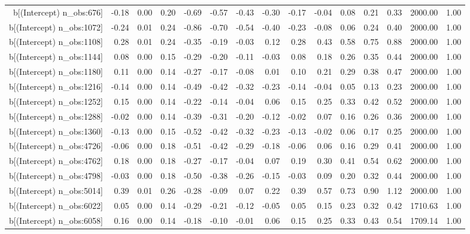 \begin{table}[ht]
\begin{tabular}{rrrrrrrrrrrrrrr}
  b[(Intercept) n\_obs:676] & -0.18 & 0.00 & 0.20 & -0.69 & -0.57 & -0.43 & -0.30 & -0.17 & -0.04 & 0.08 & 0.21 & 0.33 & 2000.00 & 1.00 \\ 
  b[(Intercept) n\_obs:1072] & -0.24 & 0.01 & 0.24 & -0.86 & -0.70 & -0.54 & -0.40 & -0.23 & -0.08 & 0.06 & 0.24 & 0.40 & 2000.00 & 1.00 \\ 
  b[(Intercept) n\_obs:1108] & 0.28 & 0.01 & 0.24 & -0.35 & -0.19 & -0.03 & 0.12 & 0.28 & 0.43 & 0.58 & 0.75 & 0.88 & 2000.00 & 1.00 \\ 
  b[(Intercept) n\_obs:1144] & 0.08 & 0.00 & 0.15 & -0.29 & -0.20 & -0.11 & -0.03 & 0.08 & 0.18 & 0.26 & 0.35 & 0.44 & 2000.00 & 1.00 \\ 
  b[(Intercept) n\_obs:1180] & 0.11 & 0.00 & 0.14 & -0.27 & -0.17 & -0.08 & 0.01 & 0.10 & 0.21 & 0.29 & 0.38 & 0.47 & 2000.00 & 1.00 \\ 
  b[(Intercept) n\_obs:1216] & -0.14 & 0.00 & 0.14 & -0.49 & -0.42 & -0.32 & -0.23 & -0.14 & -0.04 & 0.05 & 0.13 & 0.23 & 2000.00 & 1.00 \\ 
  b[(Intercept) n\_obs:1252] & 0.15 & 0.00 & 0.14 & -0.22 & -0.14 & -0.04 & 0.06 & 0.15 & 0.25 & 0.33 & 0.42 & 0.52 & 2000.00 & 1.00 \\ 
  b[(Intercept) n\_obs:1288] & -0.02 & 0.00 & 0.14 & -0.39 & -0.31 & -0.20 & -0.12 & -0.02 & 0.07 & 0.16 & 0.26 & 0.36 & 2000.00 & 1.00 \\ 
  b[(Intercept) n\_obs:1360] & -0.13 & 0.00 & 0.15 & -0.52 & -0.42 & -0.32 & -0.23 & -0.13 & -0.02 & 0.06 & 0.17 & 0.25 & 2000.00 & 1.00 \\ 
  b[(Intercept) n\_obs:4726] & -0.06 & 0.00 & 0.18 & -0.51 & -0.42 & -0.29 & -0.18 & -0.06 & 0.06 & 0.16 & 0.29 & 0.41 & 2000.00 & 1.00 \\ 
  b[(Intercept) n\_obs:4762] & 0.18 & 0.00 & 0.18 & -0.27 & -0.17 & -0.04 & 0.07 & 0.19 & 0.30 & 0.41 & 0.54 & 0.62 & 2000.00 & 1.00 \\ 
  b[(Intercept) n\_obs:4798] & -0.03 & 0.00 & 0.18 & -0.50 & -0.38 & -0.26 & -0.15 & -0.03 & 0.09 & 0.20 & 0.32 & 0.44 & 2000.00 & 1.00 \\ 
  b[(Intercept) n\_obs:5014] & 0.39 & 0.01 & 0.26 & -0.28 & -0.09 & 0.07 & 0.22 & 0.39 & 0.57 & 0.73 & 0.90 & 1.12 & 2000.00 & 1.00 \\ 
  b[(Intercept) n\_obs:6022] & 0.05 & 0.00 & 0.14 & -0.29 & -0.21 & -0.12 & -0.05 & 0.05 & 0.15 & 0.23 & 0.32 & 0.42 & 1710.63 & 1.00 \\ 
  b[(Intercept) n\_obs:6058] & 0.16 & 0.00 & 0.14 & -0.18 & -0.10 & -0.01 & 0.06 & 0.15 & 0.25 & 0.33 & 0.43 & 0.54 & 1709.14 & 1.00 \\ 

\end{tabular}
\end{table}
